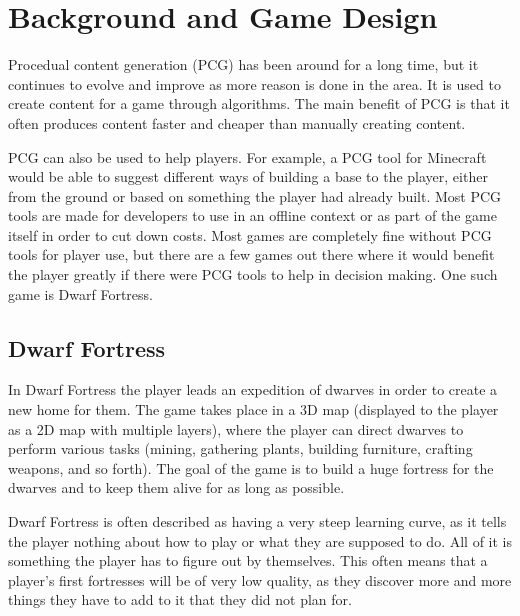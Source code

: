 \section{Background and Game Design}
\label{02}
Procedual content generation (PCG) has been around for a long time, but it continues to evolve and improve as more reason is done in the area. It is used to create content for a game through algorithms. The main benefit of PCG is that it often produces content faster and cheaper than manually creating content.

PCG can also be used to help players. For example, a PCG tool for Minecraft would be able to suggest different ways of building a base to the player, either from the ground or based on something the player had already built. Most PCG tools are made for developers to use in an offline context or as part of the game itself in order to cut down costs. Most games are completely fine without PCG tools for player use, but there are a few games out there where it would benefit the player greatly if there were PCG tools to help in decision making. One such game is Dwarf Fortress.

\subsection{Dwarf Fortress}
\label{02_DF}
In Dwarf Fortress the player leads an expedition of dwarves in order to create a new home for them. The game takes place in a 3D map (displayed to the player as a 2D map with multiple layers), where the player can direct dwarves to perform various tasks (mining, gathering plants, building furniture, crafting weapons, and so forth). The goal of the game is to build a huge fortress for the dwarves and to keep them alive for as long as possible.

Dwarf Fortress is often described as having a very steep learning curve, as it tells the player nothing about how to play or what they are supposed to do. All of it is something the player has to figure out by themselves. This often means that a player's first fortresses will be of very low quality, as they discover more and more things they have to add to it that they did not plan for.



